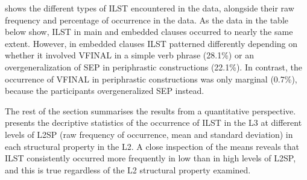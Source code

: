 \documentclass[output=paper,modfonts,nonflat, newtxmath]{langsci/langscibook}
\begin{document}
 shows the different types of ILST encountered in the data, alongside their raw frequency and percentage of occurrence in the data. As the data in the table below show, ILST in main and embedded clauses occurred to nearly the same extent. However, in embedded clauses ILST patterned differently depending on whether it involved VFINAL in a simple verb phrase (28.1\%) or an overgeneralization of SEP in periphrastic constructions (22.1\%). In contrast, the occurrence of VFINAL in periphrastic constructions was only marginal (0.7\%), because the participants overgeneralized SEP instead.

\begin{table}
\caption{Types of ILST in the L3. Raw frequency and percentage\label{tab:sanchez7:4}}
\end{table}

The rest of the section summarises the results from a quantitative perspective.  presents the decriptive statistics of the occurrence of ILST in the L3 at different levels of L2SP (raw frequency of occurrence, mean and standard deviation) in each structural property in the L2. A close inspection of the means reveals that ILST consistently occurred more frequently in low than in high levels of L2SP, and this is true regardless of the L2 structural property examined.
\end{document}
